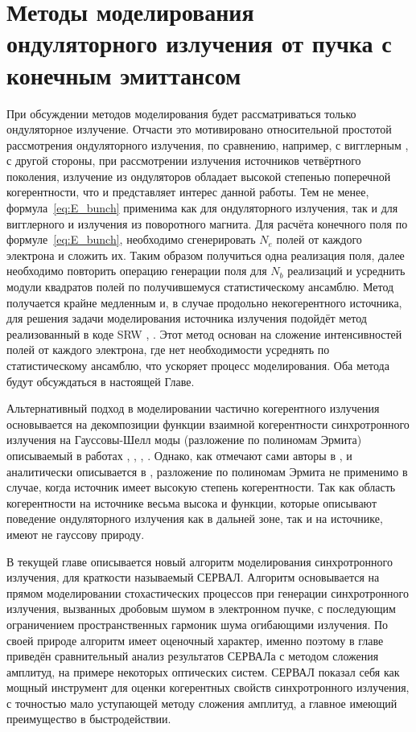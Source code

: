 
\chapter{Методы моделирования ондуляторного излучения от пучка с конечным эмиттансом} \label{chapt2}
При обсуждении методов моделирования будет рассматриваться только ондуляторное излучение. Отчасти это мотивировано относительной простотой рассмотрения ондуляторного излучения, по сравнению, например, с вигглерным \cite{geloni_brightness_2014}, с другой стороны, при рассмотрении излучения источников четвёртного поколения,  излучение из ондуляторов обладает высокой степенью поперечной когерентности, что и представляет интерес данной работы. Тем не менее, формула~\ref{eq:E_bunch} применима как для ондуляторного излучения, так и для вигглерного и излучения из поворотного магнита. Для расчёта конечного поля по формуле~\ref{eq:E_bunch}, необходимо сгенерировать $N_e$ полей от каждого электрона и сложить их. Таким образом получиться одна реализация поля, далее необходимо повторить операцию генерации поля для $N_b$ реализаций и усреднить модули квадратов полей по получившемуся статистическому ансамблю. Метод получается крайне медленным и, в случае продольно некогерентного источника, для решения задачи моделирования источника излучения подойдёт метод реализованный в коде SRW \cite{chubar_accurate_1998}, \cite{chubar_simulation_2006}. Этот метод основан на сложение интенсивностей полей от каждого электрона, где нет необходимости усреднять по статистическому ансамблю, что ускоряет процесс моделирования. Оба метода будут обсуждаться в настоящей Главе. 

Альтернативный подход в моделировании частично когерентного излучения основывается на декомпозиции функции взаимной когерентности синхротронного излучения на Гауссовы-Шелл моды (разложение по полиномам Эрмита) описываемый в работах \cite{singer_modelling_2011}, \cite{hua_application_2012}, \cite{khubbutdinov_coherence_2019}, \cite{noauthor_iucr_nodate}. Однако, как отмечают сами авторы в \cite{khubbutdinov_coherence_2019}, \cite{noauthor_iucr_nodate} и аналитически описывается в \cite{geloni_transverse_2008}, разложение по полиномам Эрмита не применимо в случае, когда источник имеет высокую степень когерентности. Так как область когерентности на источнике весьма высока и функции, которые описывают поведение ондуляторного излучения как в дальней зоне, так и на источнике, имеют не гауссову природу.

В текущей главе описывается новый алгоритм моделирования синхротронного излучения, для краткости называемый СЕРВАЛ. Алгоритм основывается на прямом моделировании стохастических процессов при генерации синхротронного излучения, вызванных дробовым шумом в электронном пучке, с последующим ограничением пространственных гармоник шума огибающими излучения. По своей природе алгоритм имеет оценочный характер, именно поэтому в главе приведён сравнительный анализ результатов СЕРВАЛа с методом сложения амплитуд, на примере некоторых оптических систем. СЕРВАЛ показал себя как мощный инструмент для оценки когерентных свойств синхротронного излучения, с точностью мало уступающей методу сложения амплитуд, а главное имеющий преимущество в быстродействии. 
